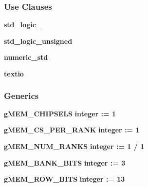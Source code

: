 \subsubsection*{Use Clauses}
 \begin{DoxyCompactItemize}
\item 
{\bf std\+\_\+logic\+\_}   
\item 
{\bf std\+\_\+logic\+\_\+unsigned}   
\item 
{\bf numeric\+\_\+std}   
\item 
{\bf textio}   
\end{DoxyCompactItemize}
\subsubsection*{Generics}
 \begin{DoxyCompactItemize}
\item 
{\bf g\+M\+E\+M\+\_\+\+C\+H\+I\+P\+S\+E\+LS} {\bfseries {\bfseries \textcolor{comment}{integer}\textcolor{vhdlchar}{ }\textcolor{vhdlchar}{ }\textcolor{vhdlchar}{\+:}\textcolor{vhdlchar}{=}\textcolor{vhdlchar}{ }\textcolor{vhdlchar}{ } \textcolor{vhdldigit}{1} \textcolor{vhdlchar}{ }}} 
\item 
{\bf g\+M\+E\+M\+\_\+\+C\+S\+\_\+\+P\+E\+R\+\_\+\+R\+A\+NK} {\bfseries {\bfseries \textcolor{comment}{integer}\textcolor{vhdlchar}{ }\textcolor{vhdlchar}{ }\textcolor{vhdlchar}{\+:}\textcolor{vhdlchar}{=}\textcolor{vhdlchar}{ }\textcolor{vhdlchar}{ } \textcolor{vhdldigit}{1} \textcolor{vhdlchar}{ }}} 
\item 
{\bf g\+M\+E\+M\+\_\+\+N\+U\+M\+\_\+\+R\+A\+N\+KS} {\bfseries {\bfseries \textcolor{comment}{integer}\textcolor{vhdlchar}{ }\textcolor{vhdlchar}{ }\textcolor{vhdlchar}{\+:}\textcolor{vhdlchar}{=}\textcolor{vhdlchar}{ }\textcolor{vhdlchar}{ } \textcolor{vhdldigit}{1} \textcolor{vhdlchar}{/}\textcolor{vhdlchar}{ } \textcolor{vhdldigit}{1} \textcolor{vhdlchar}{ }}} 
\item 
{\bf g\+M\+E\+M\+\_\+\+B\+A\+N\+K\+\_\+\+B\+I\+TS} {\bfseries {\bfseries \textcolor{comment}{integer}\textcolor{vhdlchar}{ }\textcolor{vhdlchar}{ }\textcolor{vhdlchar}{\+:}\textcolor{vhdlchar}{=}\textcolor{vhdlchar}{ }\textcolor{vhdlchar}{ } \textcolor{vhdldigit}{3} \textcolor{vhdlchar}{ }}} 
\item 
{\bf g\+M\+E\+M\+\_\+\+R\+O\+W\+\_\+\+B\+I\+TS} {\bfseries {\bfseries \textcolor{comment}{integer}\textcolor{vhdlchar}{ }\textcolor{vhdlchar}{ }\textcolor{vhdlchar}{\+:}\textcolor{vhdlchar}{=}\textcolor{vhdlchar}{ }\textcolor{vhdlchar}{ } \textcolor{vhdldigit}{13} \textcolor{vhdlchar}{ }}} 

\end{DoxyCompactItemize}

